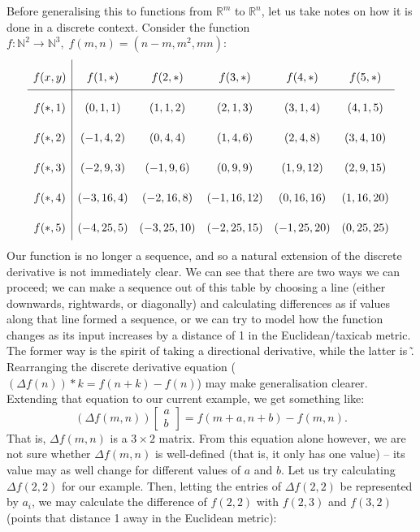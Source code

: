 \documentclass{article}
\theoremstyle{definition}
\begin{document}
Before generalising this to functions from $\mathbb{R}^m$ to $\mathbb{R}^n$, let us take notes on how it is done in a discrete context. Consider the function $f:\mathbb{N}^2\rightarrow \mathbb{N}^3,\;f(m,n)=(n-m,m^2,mn)$:
\begin{align*}
	\def\arraystretch{2.2}
	\begin{array}{c|ccccc}
		f(x,y) & f(1,*) & f(2,*) & f(3,*) & f(4,*) & f(5,*) \\
		\hline
		f(*,1) & (0,1,1) & (1,1,2) & (2,1,3) & (3,1,4) & (4,1,5) \\
		f(*,2) & (-1,4,2) & (0,4,4) & (1,4,6) & (2,4,8) & (3,4,10) \\
		f(*,3) & (-2,9,3) & (-1,9,6) & (0,9,9) & (1,9,12) & (2,9,15) \\
		f(*,4) & (-3,16,4) & (-2,16,8) & (-1,16,12) & (0,16,16) & (1,16,20) \\
		f(*,5) & (-4,25,5) & (-3,25,10) & (-2,25,15) & (-1,25,20) & (0,25,25) \\
	\end{array}
\end{align*}
Our function is no longer a sequence, and so a natural extension of the discrete derivative is not immediately clear. We can see that there are two ways we can proceed; we can make a sequence out of this table by choosing a line (either downwards, rightwards, or diagonally) and calculating differences as if values along that line formed a sequence, or we can try to model how the function changes as its input increases by a distance of 1 in the Euclidean/taxicab metric. The former way is the spirit of taking a directional derivative, while the latter is \~. Rearranging the discrete derivative equation ($(\Delta f(n))*k=f(n+k)-f(n)$) may make generalisation clearer. Extending that equation to our current example, we get something like:
\[(\Delta f(m,n))\begin{bmatrix}a\\b\end{bmatrix}=f(m+a,n+b)-f(m,n).\]
That is, $\Delta f(m,n)$ is a $3\times2$ matrix. From this equation alone however, we are not sure whether $\Delta f(m,n)$ is well-defined (that is, it only has one value) -- its value may as well change for different values of $a$ and $b$.
Let us try calculating $\Delta f(2,2)$ for our example. Then, letting the entries of $\Delta f(2,2)$ be represented by $a_i$, we may calculate the difference of $f(2,2)$ with $f(2,3)$ and $f(3,2)$ (points that distance 1 away in the Euclidean metric):
\end{document}
